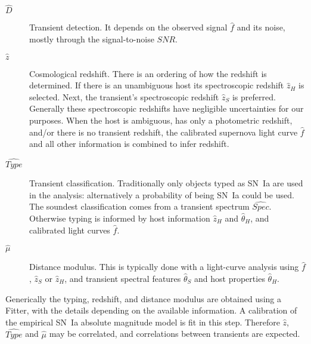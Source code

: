 \documentclass[preprint]{aastex}
\begin{document}
\begin{description}
\item[$\hat{D}$] Transient detection.  It depends on
the observed signal $\hat{f}$ and its noise, mostly through the signal-to-noise
$\mathit{SNR}$.
\item[$\hat{z}$] Cosmological redshift.  There is an ordering of how the redshift
is determined. If there is an unambiguous host its spectroscopic redshift $\hat{z}_H$ is
selected.  Next, the transient's spectroscopic redshift $\hat{z}_S$ is preferred.
Generally these spectroscopic redshifts have negligible uncertainties for our purposes.
When the host is ambiguous, has only a photometric redshift, and/or there is
no transient redshift,
the calibrated supernova light curve $\hat{f}$ and all other information is combined to
infer redshift.
\item[$\hat{\mathit{Type}}$] Transient classification.  Traditionally only objects
typed as SN~Ia are used in the analysis: alternatively a probability of being
SN~Ia could be used.  The soundest classification comes from a transient
spectrum $\hat{\mathit{Spec}}$.  Otherwise typing is informed by host information
$\hat{z}_H$ and $\hat{\theta}_H$, and
calibrated light curves $\hat{f}$.
\item[ $\hat{\mu}$]  Distance modulus.  This is typically done with a light-curve
analysis using $\hat{f}$, $\hat{z}_S$ or
$\hat{z}_H$, and transient spectral features $\hat{\theta}_S$ and host
properties $\hat{\theta}_H$.
\end{description}

Generically the typing, redshift, and distance modulus are obtained
using a Fitter, with the details depending on the available information.
A calibration of the empirical SN~Ia absolute magnitude model is fit in this step.
Therefore $\hat{z}$, $\hat{\mathit{Type}}$
and $\hat{\mu}$ may be correlated, and correlations between transients are expected.
\end{document}
